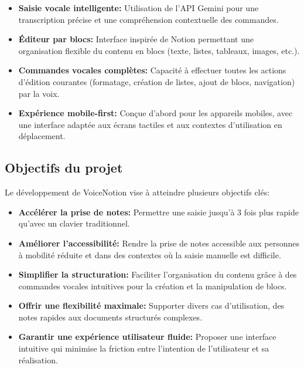 \begin{itemize}
    \item \textbf{Saisie vocale intelligente:} Utilisation de l'API Gemini pour une transcription précise et une compréhension contextuelle des commandes.
    
    \item \textbf{Éditeur par blocs:} Interface inspirée de Notion permettant une organisation flexible du contenu en blocs (texte, listes, tableaux, images, etc.).
    
    \item \textbf{Commandes vocales complètes:} Capacité à effectuer toutes les actions d'édition courantes (formatage, création de listes, ajout de blocs, navigation) par la voix.
    
    \item \textbf{Expérience mobile-first:} Conçue d'abord pour les appareils mobiles, avec une interface adaptée aux écrans tactiles et aux contextes d'utilisation en déplacement.
\end{itemize}


\subsection{Objectifs du projet}

Le développement de VoiceNotion vise à atteindre plusieurs objectifs clés:

\begin{itemize}
    \item \textbf{Accélérer la prise de notes:} Permettre une saisie jusqu'à 3 fois plus rapide qu'avec un clavier traditionnel.
    
    \item \textbf{Améliorer l'accessibilité:} Rendre la prise de notes accessible aux personnes à mobilité réduite et dans des contextes où la saisie manuelle est difficile.
    
    \item \textbf{Simplifier la structuration:} Faciliter l'organisation du contenu grâce à des commandes vocales intuitives pour la création et la manipulation de blocs.
    
    \item \textbf{Offrir une flexibilité maximale:} Supporter divers cas d'utilisation, des notes rapides aux documents structurés complexes.
    
    \item \textbf{Garantir une expérience utilisateur fluide:} Proposer une interface intuitive qui minimise la friction entre l'intention de l'utilisateur et sa réalisation.
\end{itemize}

